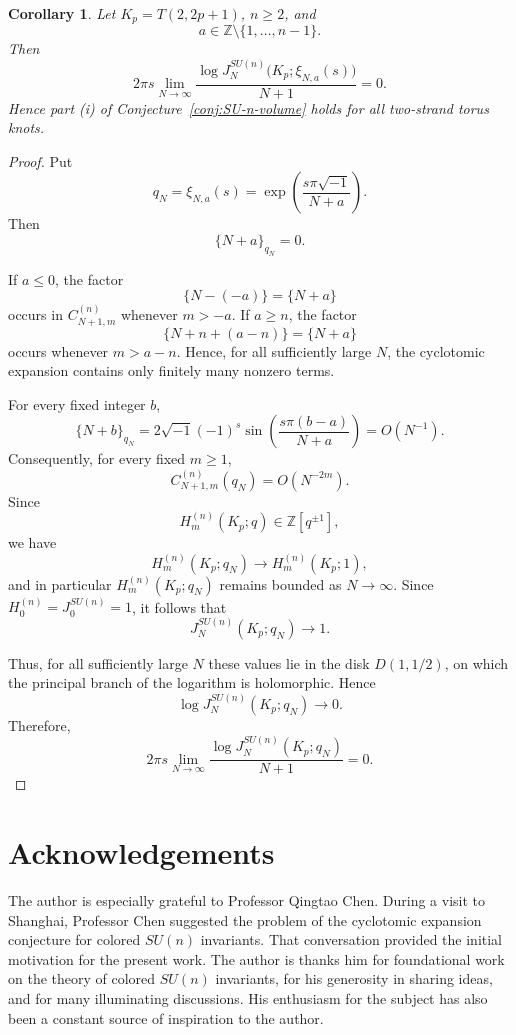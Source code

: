 \documentclass[11pt]{amsart}
\newtheorem{corollary}[theorem]{Corollary}
\begin{document}
\begin{corollary}\label{cor:zero-volume-regime}
Let \(K_p=T(2,2p+1)\), \(n\geq2\), and
\[
a\in\mathbb Z\setminus\{1,\ldots,n-1\}.
\]
Then
\[
2\pi s
\lim_{N\to\infty}
\frac{
\log J_N^{SU(n)}
\bigl(K_p;\xi_{N,a}(s)\bigr)
}{
N+1
}
=
0.
\]
Hence part {\rm (i)} of
Conjecture~\ref{conj:SU-n-volume} holds for all two-strand torus knots.
\end{corollary}

\begin{proof}
Put
\[
q_N=\xi_{N,a}(s)
=
\exp\left(\frac{s\pi\sqrt{-1}}{N+a}\right).
\]
Then
\[
\{N+a\}_{q_N}=0.
\]

If \(a\leq0\), the factor
\[
\{N-(-a)\}=\{N+a\}
\]
occurs in \(C_{N+1,m}^{(n)}\) whenever \(m>-a\).  If \(a\geq n\),
the factor
\[
\{N+n+(a-n)\}=\{N+a\}
\]
occurs whenever \(m>a-n\).  Hence, for all sufficiently large \(N\),
the cyclotomic expansion contains only finitely many nonzero terms.

For every fixed integer \(b\),
\[
\{N+b\}_{q_N}
=
2\sqrt{-1}(-1)^s
\sin\left(
\frac{s\pi(b-a)}{N+a}
\right)
=
O(N^{-1}).
\]
Consequently, for every fixed \(m\geq1\),
\[
C_{N+1,m}^{(n)}(q_N)
=
O(N^{-2m}).
\]
Since
\[
H_m^{(n)}(K_p;q)\in\mathbb Z[q^{\pm1}],
\]
we have
\[
H_m^{(n)}(K_p;q_N)
\longrightarrow
H_m^{(n)}(K_p;1),
\]
and in particular \(H_m^{(n)}(K_p;q_N)\) remains bounded as
\(N\to\infty\).  Since \(H_0^{(n)}=J_0^{SU(n)}=1\), it follows that
\[
J_N^{SU(n)}(K_p;q_N)\longrightarrow1.
\]


Thus, for all sufficiently large \(N\) these values lie in the disk
\(D(1,1/2)\), on which the principal branch of the logarithm is
holomorphic.  Hence
\[
\log J_N^{SU(n)}(K_p;q_N)\longrightarrow 0.
\]
Therefore,
\[
2\pi s
\lim_{N\to\infty}
\frac{\log J_N^{SU(n)}(K_p;q_N)}{N+1}
=0.
\]
\end{proof}


\section*{Acknowledgements}

The author is especially grateful to Professor Qingtao Chen. During a
visit to Shanghai, Professor Chen suggested the problem of the
cyclotomic expansion conjecture for colored \(SU(n)\) invariants. That
conversation provided the initial motivation for the present work.
The author is thanks him for foundational work on the theory
of colored \(SU(n)\) invariants, for his generosity in sharing ideas,
and for many illuminating discussions. His enthusiasm for the subject
has also been a constant source of inspiration to the author.
\end{document}
